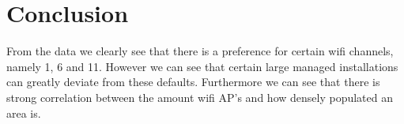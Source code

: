 \documentclass[11pt,a4paper]{article}
\begin{document}
\section{Conclusion}
From the data we clearly see that there is a preference for certain wifi channels, namely 1, 6 and 11. However we can see that certain large managed installations can greatly deviate from these defaults. Furthermore we can see that there is strong correlation between the amount wifi AP's and how densely populated an area is.
\end{document}
